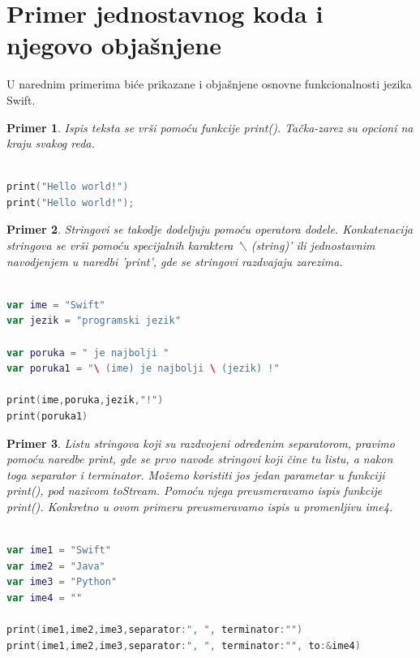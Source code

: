 \documentclass[a4paper]{article}
\newtheorem{primer}{Primer}[section]
\begin{document}
\section{Primer jednostavnog koda i njegovo objašnjene}	
\label{sec:sestiDeo}

U narednim primerima biće prikazane i objašnjene osnovne funkcionalnosti jezika Swift.
\begin{primer}

Ispis teksta se vrši pomoću funkcije print(). Tačka-zarez su opcioni na kraju svakog reda.
\end{primer}

\begin{lstlisting}[language=Swift, caption={Ispis teksta},frame=single, label=simple]

print("Hello world!")
print("Hello world!");

\end{lstlisting}

\begin{primer}
Stringovi se takodje dodeljuju pomoću operatora dodele. Konkatenacija stringova se vrši pomoću specijalnih karaktera '$\backslash$ (string)' ili jednostavnim navodjenjem u naredbi 'print', gde se stringovi razdvajaju zarezima.
\end{primer}

\begin{lstlisting}[language=Swift, caption={Stringovi i konkatenacija stringova},frame=single, label=simple]

var ime = "Swift"
var jezik = "programski jezik"

var poruka = " je najbolji "
var poruka1 = "\ (ime) je najbolji \ (jezik) !" 

print(ime,poruka,jezik,"!")
print(poruka1)

\end{lstlisting}

\begin{primer}
Listu stringova koji su razdvojeni određenim separatorom, pravimo pomoću naredbe print, gde se prvo navode stringovi koji čine tu listu, a nakon toga separator i terminator. Možemo koristiti jos jedan parametar u funkciji print(), pod nazivom toStream. Pomoću njega preusmeravamo ispis funkcije print(). Konkretno u ovom primeru preusmeravamo ispis u promenljivu ime4.
\end{primer}
\begin{lstlisting}[language=Swift, caption={Lista stringova},frame=single, label=simple]

var ime1 = "Swift"
var ime2 = "Java"
var ime3 = "Python"
var ime4 = ""

print(ime1,ime2,ime3,separator:", ", terminator:"")
print(ime1,ime2,ime3,separator:", ", terminator:"", to:&ime4)

\end{lstlisting}
\end{document}
